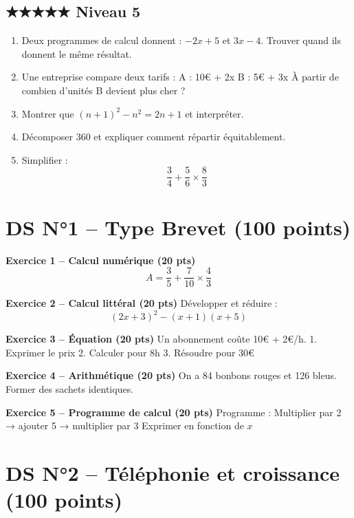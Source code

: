 \documentclass[11pt,a4paper]{article}
\begin{document}
\subsection*{★★★★★ Niveau 5}

\begin{enumerate}[resume]

\item Deux programmes de calcul donnent :  
$-2x+5$ et $3x-4$.  
Trouver quand ils donnent le même résultat.

\item Une entreprise compare deux tarifs :  
A : 10€ + 2x  
B : 5€ + 3x  
À partir de combien d’unités B devient plus cher ?

\item Montrer que $(n+1)^2 - n^2 = 2n+1$ et interpréter.

\item Décomposer 360 et expliquer comment répartir équitablement.

\item Simplifier :
\[
\frac{3}{4} + \frac{5}{6} \times \frac{8}{3}
\]

\end{enumerate}

\newpage
\section*{DS N°1 – Type Brevet (100 points)}

\textbf{Exercice 1 – Calcul numérique (20 pts)}  
\[
A = \frac{3}{5} + \frac{7}{10} \times \frac{4}{3}
\]

\textbf{Exercice 2 – Calcul littéral (20 pts)}  
Développer et réduire :
\[
(2x+3)^2 - (x+1)(x+5)
\]

\textbf{Exercice 3 – Équation (20 pts)}  
Un abonnement coûte 10€ + 2€/h.  
1. Exprimer le prix  
2. Calculer pour 8h  
3. Résoudre pour 30€

\textbf{Exercice 4 – Arithmétique (20 pts)}  
On a 84 bonbons rouges et 126 bleus.  
Former des sachets identiques.

\textbf{Exercice 5 – Programme de calcul (20 pts)}  
Programme :  
Multiplier par 2 → ajouter 5 → multiplier par 3  
Exprimer en fonction de $x$

\newpage
\section*{DS N°2 – Téléphonie et croissance (100 points)}
\end{document}
